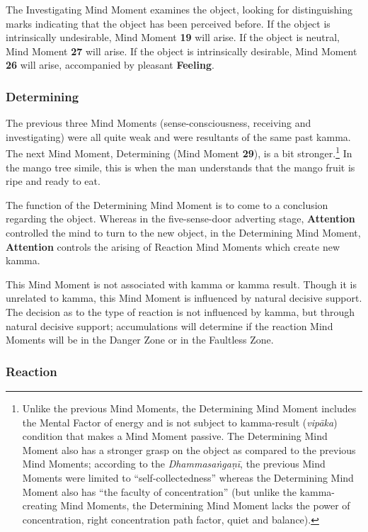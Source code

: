 The Investigating Mind Moment examines the object, looking for distinguishing marks indicating that the object has been perceived before. If the object is intrinsically undesirable, Mind Moment \textbf{19} will arise. If the object is neutral, Mind Moment \textbf{27} will arise. If the object is intrinsically desirable, Mind Moment \textbf{26} will arise, accompanied by pleasant \textbf{Feeling}.

\subsubsection*{Determining}

The previous three Mind Moments (sense-consciousness, receiving and investigating) were all quite weak and were resultants of the same past kamma. The next Mind Moment, Determining (Mind Moment \textbf{29}), is a bit stronger.\footnote{Unlike the previous Mind Moments, the Determining Mind Moment includes the Mental Factor of energy and is not subject to kamma-result (\textit{vipāka}) condition that makes a Mind Moment passive. The Determining Mind Moment also has a stronger grasp on the object as compared to the previous Mind Moments; according to the \textit{Dhammasaṅgaṇī}, the previous Mind Moments were limited to “self-collectedness” whereas the Determining Mind Moment also has “the faculty of concentration” (but unlike the kamma-creating Mind Moments, the Determining Mind Moment lacks the power of concentration, right concentration path factor, quiet and balance).} In the mango tree simile, this is when the man understands that the mango fruit is ripe and ready to eat.

The function of the Determining Mind Moment is to come to a conclusion regarding the object. Whereas in the five-sense-door adverting stage, \textbf{Attention} controlled the mind to turn to the new object, in the Determining Mind Moment, \textbf{Attention} controls the arising of Reaction Mind Moments which create new kamma.

This Mind Moment is not associated with kamma or kamma result. Though it is unrelated to kamma, this Mind Moment is influenced by natural decisive support. The decision as to the type of reaction is not influenced by kamma, but through natural decisive support; accumulations will determine if the reaction Mind Moments will be in the Danger Zone or in the Faultless Zone.

\subsubsection*{Reaction}

